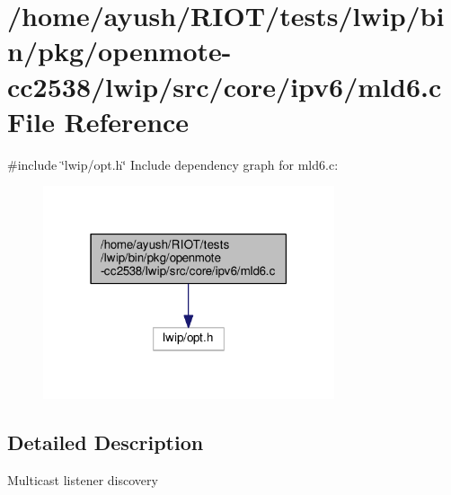 \hypertarget{openmote-cc2538_2lwip_2src_2core_2ipv6_2mld6_8c}{}\section{/home/ayush/\+R\+I\+O\+T/tests/lwip/bin/pkg/openmote-\/cc2538/lwip/src/core/ipv6/mld6.c File Reference}
\label{openmote-cc2538_2lwip_2src_2core_2ipv6_2mld6_8c}
{\ttfamily \#include \char`\"{}lwip/opt.\+h\char`\"{}}\newline
Include dependency graph for mld6.\+c\+:
\nopagebreak
\begin{figure}[H]
\begin{center}
\leavevmode
\includegraphics[width=243pt]{openmote-cc2538_2lwip_2src_2core_2ipv6_2mld6_8c__incl}
\end{center}
\end{figure}


\subsection{Detailed Description}
Multicast listener discovery 